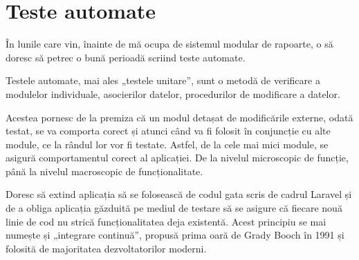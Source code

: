\section*{Teste automate}
	În lunile care vin, înainte de mă ocupa de sistemul modular de rapoarte, o să doresc să petrec o bună perioadă scriind teste automate.

	Testele automate, mai ales „testele unitare”, sunt o metodă de verificare a modulelor individuale, asocierilor datelor, procedurilor de modificare a datelor. \cite{testare_automata}

	Acestea pornesc de la premiza că un modul detașat de modificările externe, odată testat, se va comporta corect și atunci când va fi folosit în conjuncție cu alte module, ce la rândul lor vor fi testate. Astfel, de la cele mai mici module, se asigură comportamentul corect al aplicației. De la nivelul microscopic de funcție, până la nivelul macroscopic de funcționalitate.

	Doresc să extind aplicația să se folosească de codul gata scris de cadrul Laravel și de a obliga aplicația găzduită pe mediul de testare să se asigure că fiecare nouă linie de cod nu strică funcționalitatea deja existentă. Acest principiu se mai numește și „integrare continuă”, propusă prima oară de  Grady Booch în 1991 \cite{integrare_continua} și folosită de majoritatea dezvoltatorilor moderni.
